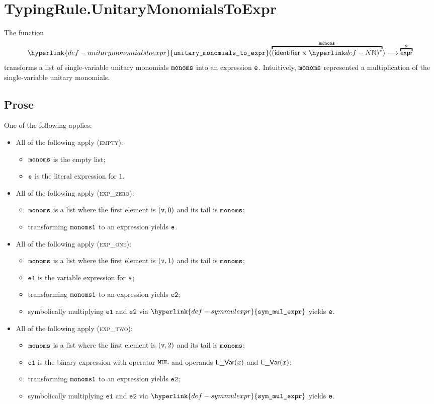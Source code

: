 \documentclass{book}
\newcommand\symmulexpr[0]{\hyperlink{def-symmulexpr}{\texttt{sym\_mul\_expr}}}
\newcommand\unitarymonomialstoexpr[0]{\hyperlink{def-unitarymonomialstoexpr}{\texttt{unitary\_monomials\_to\_expr}}}
\newcommand\veone[0]{\texttt{e1}}
\newcommand\vetwo[0]{\texttt{e2}}
\begin{document}
\section{TypingRule.UnitaryMonomialsToExpr \label{sec:TypingRule.UnitaryMonomialsToExpr}}
\hypertarget{def-unitarymonomialstoexpr}{}
The function
\[
\unitarymonomialstoexpr(\overname{(\identifier\times\N)^*}{\monoms}) \aslto \overname{\expr}{\ve}
\]
transforms a list of single-variable unitary monomials $\texttt{monoms}$ into an expression $\texttt{e}$.
Intuitively, $\texttt{monoms}$ represented a multiplication of the single-variable unitary monomials.

\subsection{Prose}
One of the following applies:
\begin{itemize}
  \item All of the following apply (\textsc{empty}):
  \begin{itemize}
    \item $\texttt{monoms}$ is the empty list;
    \item $\texttt{e}$ is the literal expression for $1$.
  \end{itemize}

  \item All of the following apply (\textsc{exp\_zero}):
  \begin{itemize}
    \item $\texttt{monoms}$ is a list where the first element is $(\texttt{v}, 0)$ and its tail is $\texttt{monoms}$;
    \item transforming $\texttt{monoms1}$ to an expression yields $\texttt{e}$.
  \end{itemize}

  \item All of the following apply (\textsc{exp\_one}):
  \begin{itemize}
    \item $\texttt{monoms}$ is a list where the first element is $(\texttt{v}, 1)$ and its tail is $\texttt{monoms}$;
    \item $\veone$ is the variable expression for $\texttt{v}$;
    \item transforming $\texttt{monoms1}$ to an expression yields $\vetwo$;
    \item symbolically multiplying $\veone$ and $\vetwo$ via $\symmulexpr$ yields $\texttt{e}$.
  \end{itemize}

  \item All of the following apply (\textsc{exp\_two}):
  \begin{itemize}
    \item $\texttt{monoms}$ is a list where the first element is $(\texttt{v}, 2)$ and its tail is $\texttt{monoms}$;
    \item $\veone$ is the binary expression with operator $\texttt{MUL}$ and operands $\textsf{E\_Var}(x)$ and $\textsf{E\_Var}(x)$;
    \item transforming $\texttt{monoms1}$ to an expression yields $\vetwo$;
    \item symbolically multiplying $\veone$ and $\vetwo$ via $\symmulexpr$ yields $\texttt{e}$.
  \end{itemize}


\end{itemize}
\end{document}
